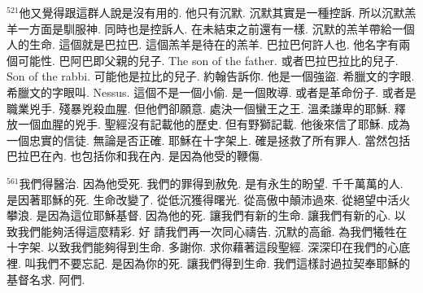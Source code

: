 \documentclass{book}
\begin{document}
$^{521}$他又覺得跟這群人說是沒有用的.
他只有沉默.
沉默其實是一種控訴.
所以沉默羔羊一方面是馴服神.
同時也是控訴人.
在未結束之前還有一樣.
沉默的羔羊帶給一個人的生命.
這個就是巴拉巴.
這個羔羊是待在的羔羊.
巴拉巴何許人也.
他名字有兩個可能性.
巴阿巴即父親的兒子.
The son of the father.
或者巴拉巴拉比的兒子.
Son of the rabbi.
可能他是拉比的兒子.
約翰告訴你.
他是一個強盜.
希臘文的字眼.
希臘文的字眼叫.
Nessus.
這個不是一個小偷.
是一個敗導.
或者是革命份子.
或者是職業兇手.
殘暴兇殺血腥.
但他們卻願意.
處決一個蠻王之王.
溫柔謙卑的耶穌.
釋放一個血腥的兇手.
聖經沒有記載他的歷史.
但有野獅記載.
他後來信了耶穌.
成為一個忠實的信徒.
無論是否正確.
耶穌在十字架上.
確是拯救了所有罪人.
當然包括巴拉巴在內.
也包括你和我在內.
是因為他受的鞭傷.

$^{561}$我們得醫治.
因為他受死.
我們的罪得到赦免.
是有永生的盼望.
千千萬萬的人.
是因著耶穌的死.
生命改變了.
從低沉獲得曙光.
從高傲中顛沛過來.
從絕望中活火攀浪.
是因為這位耶穌基督.
因為他的死.
讓我們有新的生命.
讓我們有新的心.
以致我們能夠活得這麼精彩.
好 請我們再一次同心禱告.
沉默的高爺.
為我們犧牲在十字架.
以致我們能夠得到生命.
多謝你.
求你藉著這段聖經.
深深印在我們的心底裡.
叫我們不要忘記.
是因為你的死.
讓我們得到生命.
我們這樣討過拉契奉耶穌的基督名求.
阿們.
\newpage
\end{document}
